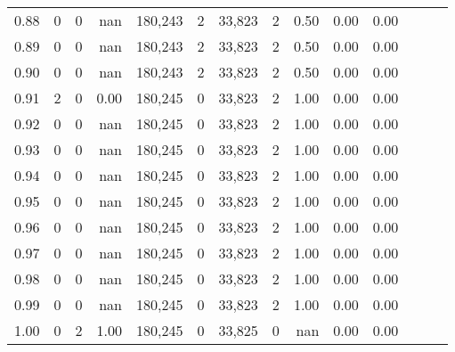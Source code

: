 \begin{tabular}{rrrrrrrrrrrrrr}
0.88 &       0 &      0 &   nan &  180,243 &        2 &  33,823 &       2 &  0.50 &  0.00 &      0.00 \\
0.89 &       0 &      0 &   nan &  180,243 &        2 &  33,823 &       2 &  0.50 &  0.00 &      0.00 \\
0.90 &       0 &      0 &   nan &  180,243 &        2 &  33,823 &       2 &  0.50 &  0.00 &      0.00 \\
0.91 &       2 &      0 &  0.00 &  180,245 &        0 &  33,823 &       2 &  1.00 &  0.00 &      0.00 \\
0.92 &       0 &      0 &   nan &  180,245 &        0 &  33,823 &       2 &  1.00 &  0.00 &      0.00 \\
0.93 &       0 &      0 &   nan &  180,245 &        0 &  33,823 &       2 &  1.00 &  0.00 &      0.00 \\
0.94 &       0 &      0 &   nan &  180,245 &        0 &  33,823 &       2 &  1.00 &  0.00 &      0.00 \\
0.95 &       0 &      0 &   nan &  180,245 &        0 &  33,823 &       2 &  1.00 &  0.00 &      0.00 \\
0.96 &       0 &      0 &   nan &  180,245 &        0 &  33,823 &       2 &  1.00 &  0.00 &      0.00 \\
0.97 &       0 &      0 &   nan &  180,245 &        0 &  33,823 &       2 &  1.00 &  0.00 &      0.00 \\
0.98 &       0 &      0 &   nan &  180,245 &        0 &  33,823 &       2 &  1.00 &  0.00 &      0.00 \\
0.99 &       0 &      0 &   nan &  180,245 &        0 &  33,823 &       2 &  1.00 &  0.00 &      0.00 \\
1.00 &       0 &      2 &  1.00 &  180,245 &        0 &  33,825 &       0 &   nan &  0.00 &      0.00 \\
\bottomrule
\end{tabular}
